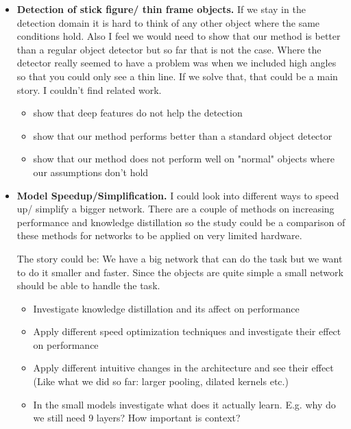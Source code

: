 \documentclass{article}
\begin{document}
\begin{itemize}
\begin{itemize}
	\item \textbf{Detection of stick figure/ thin frame objects.} If we stay in the detection domain it is hard to think of any other object where the same conditions hold. Also I feel we would need to show that our method is better than a regular object detector but so far that is not the case. Where the detector really seemed to have a problem was when we included high angles so that you could only see a thin line. If we solve that, that could be a main story. I couldn't find related work.
	\begin{itemize}
		\item show that deep features do not help the detection
		\item show that our method performs better than a standard object detector
		\item show that our method does not perform well on "normal" objects where our assumptions don't hold
	\end{itemize}
	
	
	\item \textbf{Model Speedup/Simplification.} I could look into different ways to speed up/ simplify a bigger network. There are a couple of methods on increasing performance \cite{Zhang2017a,Howard2017,Li,Ghosh2017} and knowledge distillation\cite{Shen2016,Hinton2015,Romero2014} so the study could be a comparison of these methods for networks to be applied on very limited hardware.
	
	The story could be: We have a big network that can do the task but we want to do it smaller and faster. Since the objects are quite simple a small network should be able to handle the task.
	
	\begin{itemize}
		\item Investigate knowledge distillation and its affect on performance
		\item Apply different speed optimization techniques and investigate their effect on performance
		\item Apply different intuitive changes in the architecture and see their effect (Like what we did so far: larger pooling, dilated kernels etc.)
		\item In the small models investigate what does it actually learn. E.g. why do we still need 9 layers? How important is context?
	\end{itemize}

	
\end{itemize}

\end{itemize}








\end{document}
